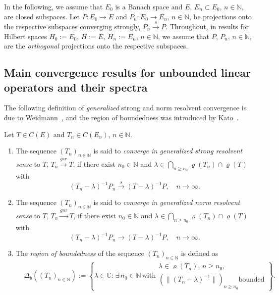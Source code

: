 \documentclass[a4paper,reqno]{amsart}
\begin{document}
{In the following, we assume  that $E_0$ is a Banach space and $E, \,E_n\subset E_0, \,n\in{\mathbb{N}},$ are closed subspaces.
Let $P:E_0\to E$ and $P_n:E_0\to E_n$, $n\in{\mathbb{N}}$, be projections onto the respective subspaces converging strongly, $P_n{\stackrel{s}{\rightarrow}} P$.
Throughout, in results for Hilbert spaces $H_0:=E_0,\,H:=E,\,H_n:=E_n$, $n\in{\mathbb{N}}$, we assume that $P$, $P_n$, $n\in{\mathbb{N}}$, are the \emph{orthogonal} projections onto the respective subspaces.

\subsection{Main convergence results for unbounded linear operators and their spectra}\label{subsectionmainresults}

The following definition of \emph{generalized} strong and norm resolvent convergence is due to Weidmann~\cite[Section~9.3]{weid1},
and the region of boundedness was introduced by Kato~\cite[Section~VIII.1]{kato}.

\begin{definition}\label{defresconv}
Let $T\in C(E)$ and $T_n\in C(E_n)$, $n\in{\mathbb{N}}$. 
\begin{enumerate}[label=\rm{\roman{*})}]
\item The sequence $(T_n)_{n\in{\mathbb{N}}}$ is said to \emph{converge in generalized strong resolvent sense} to $T$, 
$T_n{\stackrel{gsr}{\rightarrow}} T$, if there exist $n_0\in{\mathbb{N}}$ and $\lambda\in\underset{n\geq n_0}{\bigcap}\varrho(T_n)\cap\varrho(T)$ with\vspace{-2mm}
$$(T_n-\lambda)^{-1}P_n{\stackrel{s}{\longrightarrow}} (T-\lambda)^{-1}P, \quad n\to\infty.$$
\item The sequence $(T_n)_{n\in{\mathbb{N}}}$ is said to \emph{converge in generalized norm resolvent sense} to $T$, 
$T_n{\stackrel{gnr}{\rightarrow}} T$, if there exist $n_0\in{\mathbb{N}}$ and $\lambda\in\underset{n\geq n_0}{\bigcap}\varrho(T_n)\cap\varrho(T)$ with\vspace{-2mm}
$$(T_n-\lambda)^{-1}P_n{\longrightarrow} (T-\lambda)^{-1}P, \quad n\to\infty.$$
\item The \emph{region of boundedness} of the sequence $(T_n)_{n\in{\mathbb{N}}}$ is defined as 
\begin{align*}&\Delta_b\left((T_n)_{n\in{\mathbb{N}}}\right):=\left\{\lambda\in{\mathbb{C}}:\,\exists\,n_0\in{\mathbb{N}}\,\text{with}\begin{array}{l}\lambda\in\varrho(T_n),\,n\geq n_0,\\ \left(\|(T_n-\lambda)^{-1}\|\right)_{n\geq n_0} \text{bounded}\end{array}\right\}.\end{align*}
\end{enumerate}
\end{definition}

}
\end{document}

